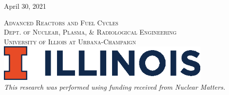 \begin{titlepage}

    \vspace{0.5cm} %
    {\large April 30, 2021} %
    \vspace{0.5cm}


    \textsc{\LARGE Advanced Reactors and Fuel Cycles}\\[0.25cm] %

    \textsc{\large Dept. of Nuclear, Plasma, \& Radiological Engineering}\\%

    \textsc{\large University of Illiois at Urbana-Champaign}\\ %




    \vspace{0.5cm}
    \includegraphics[width=0.8\textwidth]{./img/illinois.eps}\\[1cm] %


    \textit{This research was performed using funding received from Nuclear
    Matters.}

\end{titlepage}






\FloatBarrier




